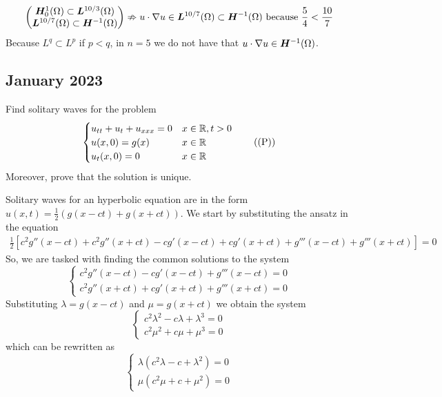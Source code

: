 \begin{itemize}
    \[
        \begin{pmatrix*}
            \bm{H}^1_0(\Omega) \subset \bm{L}^{10/3}{(\Omega)}  \\
            \bm{L}^{10/7}(\Omega) \subset \bm{H}^{-1}(\Omega)
        \end{pmatrix*}
        \nRightarrow u \cdot \grad u \in \bm{L}^{10/7}(\Omega) \subset \bm{H}^{-1}(\Omega) \text{ because } \frac{5}{4} < \frac{10}{7}
    \]
    Because \(L^q \subset L^p\) if \(p < q\), in \(n = 5\) we do not have that \(u \cdot \nabla u \in \bm{H}^{-1}(\Omega)\).
\end{itemize}

\newpage
\subsection{January 2023}
\begin{exercise}
    Find solitary waves for the problem 
    \[
        \begin{cases}
            u_{tt} + u_t + u_{xxx} = 0 & x \in \mathbb{R}, t > 0 \\
            u(x, 0) = g(x) & x \in \mathbb{R} \\
            u_t(x, 0) = 0 & x \in \mathbb{R}
        \end{cases}
        \tag{(P)}
    \]
    Moreover, prove that the solution is unique.
\end{exercise}
Solitary waves for an hyperbolic equation are in the form \(u(x, t) = \frac{1}{2} \left( g(x - ct) + g(x + ct) \right)\). We start by substituting the ansatz in the equation
\[
    \begin{split}
        \frac{1}{2} \left[c^2 g''(x - ct) + c^2 g''(x + ct) -c g'(x - ct) + c g'(x + ct)  + g'''(x - ct) + g'''(x + ct) \right] = 0
    \end{split}
\]
So, we are tasked with finding the common solutions to the system
\[
    \begin{cases}
        c^2 g''(x - ct) - c g'(x - ct) + g'''(x - ct) = 0 \\
        c^2 g''(x + ct) + c g'(x + ct) + g'''(x + ct) = 0
    \end{cases}
\]
Substituting \(\lambda = g(x - ct)\) and \(\mu = g(x + ct)\) we obtain the system
\[
    \begin{cases}
        c^2 \lambda^2 - c \lambda + \lambda^3 = 0 \\
        c^2 \mu^2 + c \mu + \mu^3 = 0
    \end{cases}
\]
which can be rewritten as
\[
    \begin{cases}
        \lambda\left( c^2 \lambda - c + \lambda^2 \right) = 0 \\
        \mu\left( c^2 \mu + c + \mu^2 \right) = 0
    \end{cases}
\]
